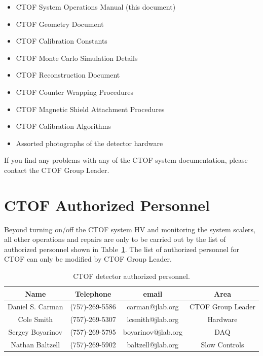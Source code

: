 \documentclass[12pt]{article}
\begin{document}
\begin{itemize}
\item CTOF System Operations Manual (this document)
\item CTOF Geometry Document
\item CTOF Calibration Constants
\item CTOF Monte Carlo Simulation Details
\item CTOF Reconstruction Document
\item CTOF Counter Wrapping Procedures
\item CTOF Magnetic Shield Attachment Procedures
\item CTOF Calibration Algorithms
\item Assorted photographs of the detector hardware
\end{itemize}

If you find any problems with any of the CTOF system documentation, please contact the CTOF
Group Leader.

\section{CTOF Authorized Personnel}
\label{personnel}

Beyond turning on/off the CTOF system HV and monitoring the system scalers, all other operations and
repairs are only to be carried out by the list of authorized personnel shown in Table~\ref{expert-list}.
The list of authorized personnel for CTOF can only be modified by CTOF Group Leader.

\begin{table}[htbp]
\begin{center}
\begin{tabular} {|c|c|c|c|} \hline
Name             & Telephone      & email              & Area             \\ \hline \hline
Daniel S. Carman & (757)-269-5586 & carman@jlab.org    & CTOF Group Leader\\ \hline
Cole Smith       & (757)-269-5307 & lcsmith@jlab.org   & Hardware         \\ \hline
Sergey Boyarinov & (757)-269-5795 & boyarinov@jlab.org & DAQ              \\ \hline
Nathan Baltzell  & (757)-269-5902 & baltzell@jlab.org  & Slow Controls    \\ \hline
\end{tabular}
\caption{CTOF detector authorized personnel.}
\label{expert-list}
\end{center}
\end{table}
\end{document}

